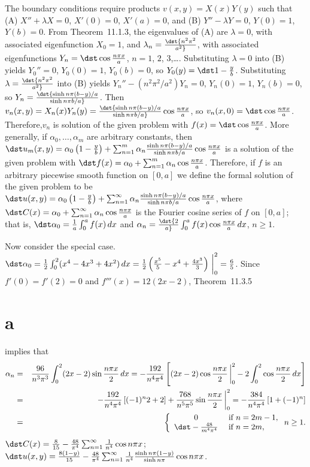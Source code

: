 \documentclass[dvips]{book}
\renewcommand{\exer}[1]{\par\medskip\;\noindent{\color{red}\bf #1.}}
\numberwithin{example}{section}
\numberwithin{equation}{section}
\numberwithin{theorem}{section}
\numberwithin{table}{section}
\numberwithin{figure}{section}
\newcommand{\lims}[2]{\,\bigg|_{#1}^{#2}}
\begin{document}
\exer{12.3.18}
The boundary conditions require products $v(x,y)=X(x)Y(y)$
such that
(A)  $X''+\lambda X=0$, $X'(0)=0$, $X'(a)=0$, and
(B)  $Y''-\lambda Y=0$, $Y(0)=1$, $Y(b)=0$.
From Theorem~11.1.3, the eigenvalues of (A) are
$\lambda=0$, with associated eigenfunction $X_0=1$, and
$\lambda_n=\dst{n^2\pi^2\over a^2}$, with associated eigenfunctions
$Y_n=\dst\cos{n\pi x\over a}$, $n=1$, $2$, $3$,\dots.
Substituting $\lambda=0$ into (B) yields $Y_0''=0$,
$Y_0(0)=1$, $Y_0(b)=0$,
so $Y_0(y)=\dst1-{y\over b}$.
Substituting $\lambda=\dst{n^2\pi^2\over a^2}$  into (B) yields
$Y_n''-({n^2\pi^2/a^2})Y_n=0$, $Y_n(0)=1$,  $Y_n(b)=0$, so
$Y_n=\dst{\sinh n\pi(b-y)/a\over \sinh n\pi b/a}$. Then
$v_n(x,y)=X_n(x)Y_n(y)=
\dst{\sinh n\pi(b-y)/a\over\sinh n\pi
b/a}\cos{n\pi x\over a}$, so
$v_n(x,0)=\dst\cos{n\pi x\over a}$.
Therefore,$v_n$ is solution of the given problem  with
$f(x)=\dst\cos{n\pi x\over a}$. More generally,
 if $\alpha_0,\dots,\alpha_m$ are arbitrary constants,
then
$\dst
u_m(x,y)=\alpha_0\left(1-{y\over b}\right)+\sum_{n=1}^m\alpha_n{\sinh
n\pi(b-y)/ a\over\sinh n\pi b/a}\cos
{n\pi x\over a}$
 is a solution of the given problem with
$\dst f(x)=\alpha_0+\sum_{n=1}^m\alpha_n\cos{n\pi x\over a}$.
Therefore, if $f$ is an arbitrary piecewise smooth function on
$[0,a]$  we define the formal solution of the given problem  to be
$\dst
u(x,y)=\alpha_0\left(1-{y\over
b}\right)+\sum_{n=1}^\infty\alpha_n{\sinh
n\pi(b-y)/ a\over\sinh n\pi b/a}\cos
{n\pi x\over a}$,
where
$\dst C(x)=\alpha_0+\sum_{n=1}^\infty \alpha_n\cos{n\pi x\over a}$
is the Fourier  cosine series of $f$ on $[0,a]$; that is,
$\dst\alpha_0={1\over a}\int_0^a f(x)\,dx$ and
$\alpha_n=\dst{2\over a}\int_0^a f(x)\cos
{n\pi x\over a}\,dx$, $n\ge1$.


Now consider the special case.
$\dst \alpha_0={1\over 2}\int_0^2(x^4-4x^3+4x^2)\,dx={1\over
2}\left({x^5\over5}-x^4+{4x^3\over3}
\right)\lims02={6\over5}$.
Since  $f'(0)=f'(2)=0$ and  $f'''(x)=12(2x-2)$,
Theorem~11.3.5\part{a} implies that
\begin{eqnarray*}
\alpha_n&=&
{96\over n^3\pi^3}\int_0^2(2x-2)\sin{n\pi x\over 2}\,dx
=-{192\over n^4\pi^4}\left[(2x-2)\cos{n\pi x\over 2}\lims02
-2\int_0^2\cos{n\pi x\over 2}\,dx\right]\\
&=&-{192\over n^4\pi^4}\left[(-1)^n2+2\right]+
{768\over n^5\pi^5}\sin{n\pi x\over 2}\lims02=
-{384\over n^4\pi^4}\left[1+(-1)^n\right]\\
&=&
\left\{\begin{array}{cl}
0&\mbox{ if }n=2m-1,\\
\dst-{48\over m^4\pi^4}&\mbox{ if }n=2m,
\end{array}\right.
n\ge1.
\end{eqnarray*}
$\dst C(x)={8\over15}-{48\over\pi^4}\sum_{n=1}^\infty{1\over
n^4}\cos n\pi x$;
$\dst u(x,y)={8(1-y)\over15}-{48\over\pi^4}\sum_{n=1}^\infty{1\over
n^4}{\sinh n\pi(1-y)\over\sinh n\pi}\cos n\pi x$.
\end{document}
